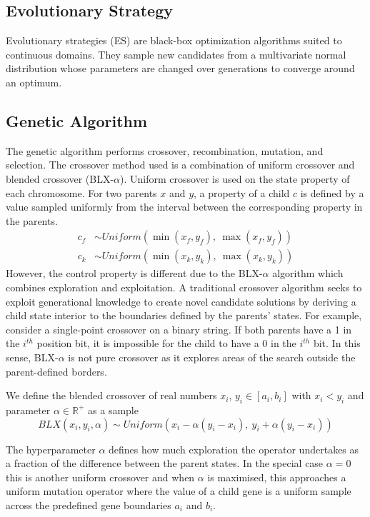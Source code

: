 \subsection{Evolutionary Strategy}
Evolutionary strategies (ES) are black-box optimization algorithms suited to continuous domains. They sample new candidates from a multivariate normal distribution whose parameters are changed over generations to converge around an optimum. 

\subsection{Genetic Algorithm}
The genetic algorithm performs crossover, recombination, mutation, and selection. The crossover method used is a combination of uniform crossover and blended crossover (BLX-$\alpha$). Uniform crossover is used on the state property of each chromosome. For two parents $x$ and $y$, a property of a child $c$ is defined by a value sampled uniformly from the interval between the corresponding property in the parents.
\begin{align*}
  c_f &\sim \mathit{Uniform}(\min(x_f, y_f),\ \max(x_f, y_f))\\
  c_k &\sim \mathit{Uniform}(\min(x_k, y_k),\ \max(x_k, y_k))
\end{align*}
However, the control property is different due to the BLX-$\alpha$ algorithm which combines exploration and exploitation. A traditional crossover algorithm seeks to exploit generational knowledge to create novel candidate solutions by deriving a child state interior to the boundaries defined by the parents' states. For example, consider a single-point crossover on a binary string. If both parents have a 1 in the $i^{th}$ position bit, it is impossible for the child to have a 0 in the $i^{th}$ bit. In this sense, BLX-$\alpha$ is not pure crossover as it explores areas of the search outside the parent-defined borders.

\begin{definition}
We define the blended crossover of real numbers $x_i$, $y_i \in [a_i, b_i]$ with $x_i < y_i$ and parameter $\alpha \in \mathbb{R^+}$ as a sample\\
\[
  BLX(x_i, y_i, \alpha) \sim \mathit{Uniform}(x_i - \alpha(y_i - x_i),\  y_i + \alpha(y_i - x_i))
\]
\end{definition}
The hyperparameter $\alpha$ defines how much exploration the operator undertakes as a fraction of the difference between the parent states. In the special case $\alpha = 0$ this is another uniform crossover and when $\alpha$ is maximised, this approaches a uniform mutation operator where the value of a child gene is a uniform sample across the predefined gene boundaries $a_i$ and $b_i$.

